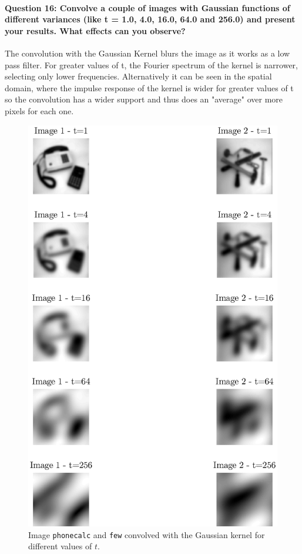 \documentclass[12pt]{article}
\begin{document}
\paragraph{Question 16: Convolve a couple of images with Gaussian functions of different variances
(like t = 1.0, 4.0, 16.0, 64.0 and 256.0) and present your results. What effects can you
observe?}
The convolution with the Gaussian Kernel blurs the image as it works as a low pass filter. For greater values of t, the Fourier spectrum of the kernel is narrower, selecting only lower frequencies. Alternatively it can be seen in the spatial domain, where the impulse response of the kernel is wider for greater values of t so the convolution has a wider support and thus does an "average" over more pixels for each one.

\begin{figure}[htbp]
 \centering
 \includegraphics[width=\textwidth]{q16}
 \caption{Image \texttt{phonecalc} and \texttt{few} convolved with the Gaussian kernel for different values of \(t\).}
 \label{fig:q16}
\end{figure}
\end{document}
